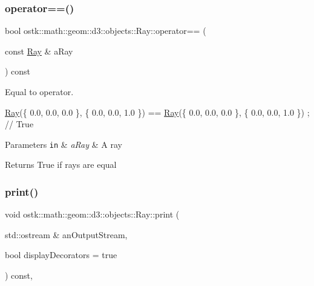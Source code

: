 \subsubsection{\texorpdfstring{operator==()}{operator==()}}
{\footnotesize\ttfamily bool ostk\+::math\+::geom\+::d3\+::objects\+::\+Ray\+::operator== (\begin{DoxyParamCaption}\item[{const \hyperlink{classostk_1_1math_1_1geom_1_1d3_1_1objects_1_1_ray}{Ray} \&}]{a\+Ray }\end{DoxyParamCaption}) const}



Equal to operator. 


\begin{DoxyCode}
\hyperlink{classostk_1_1math_1_1geom_1_1d3_1_1objects_1_1_ray_a78335698f8a4f72e613e607b13121df0}{Ray}(\{ 0.0, 0.0, 0.0 \}, \{ 0.0, 0.0, 1.0 \}) == \hyperlink{classostk_1_1math_1_1geom_1_1d3_1_1objects_1_1_ray_a78335698f8a4f72e613e607b13121df0}{Ray}(\{ 0.0, 0.0, 0.0 \}, \{ 0.0, 0.0, 1.0 \}) ; \textcolor{comment}{// True}
\end{DoxyCode}



\begin{DoxyParams}[1]{Parameters}
\mbox{\tt in}  & {\em a\+Ray} & A ray \\
\hline
\end{DoxyParams}
\begin{DoxyReturn}{Returns}
True if rays are equal 
\end{DoxyReturn}
\mbox{\label{classostk_1_1math_1_1geom_1_1d3_1_1objects_1_1_ray_af2aed02d301de6d224cc757b7db573a7}} 
\subsubsection{\texorpdfstring{print()}{print()}}
{\footnotesize\ttfamily void ostk\+::math\+::geom\+::d3\+::objects\+::\+Ray\+::print (\begin{DoxyParamCaption}\item[{std\+::ostream \&}]{an\+Output\+Stream,  }\item[{bool}]{display\+Decorators = {\ttfamily true} }\end{DoxyParamCaption}) const\hspace{0.3cm}{\ttfamily [override]}, {\ttfamily [virtual]}}



